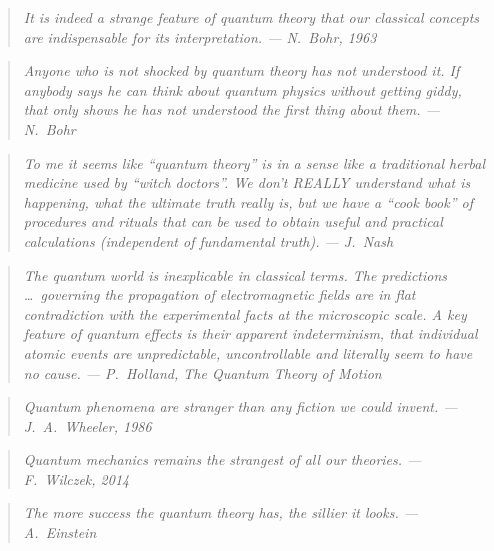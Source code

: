 \begin{quote}
\itshape It is indeed a strange feature of quantum theory that our classical concepts are indispensable for its interpretation. \normalfont\hfill --- N.~Bohr, 1963
\end{quote}

\begin{quote}
\itshape Anyone who is not shocked by quantum theory has not understood it. If anybody says he can think about quantum physics without getting giddy, that only shows he has not understood the first thing about them. \normalfont\hfill --- N.~Bohr
\end{quote}

\begin{quote}
\itshape To me it seems like ``quantum theory'' is in a sense like a traditional herbal medicine used by ``witch doctors''. We don't REALLY understand what is happening, what the ultimate truth really is, but we have a ``cook book'' of procedures and rituals that can be used to obtain useful and practical calculations (independent of fundamental truth). \normalfont\hfill --- J.~Nash
\end{quote}

\begin{quote}
\itshape The quantum world is inexplicable in classical terms. The predictions \ldots\ governing the propagation of electromagnetic fields are in flat contradiction with the experimental facts at the microscopic scale. A key feature of quantum effects is their apparent indeterminism, that individual atomic events are unpredictable, uncontrollable and literally seem to have no cause. \normalfont\hfill --- P.~Holland, \emph{The Quantum Theory of Motion}
\end{quote}

\begin{quote}
\itshape Quantum phenomena are stranger than any fiction we could invent. \normalfont\hfill --- J.~A.~Wheeler, 1986
\end{quote}

\begin{quote}
\itshape Quantum mechanics remains the strangest of all our theories. \normalfont\hfill --- F.~Wilczek, 2014
\end{quote}

\begin{quote}
\itshape The more success the quantum theory has, the sillier it looks. \normalfont\hfill --- A.~Einstein
\end{quote}

